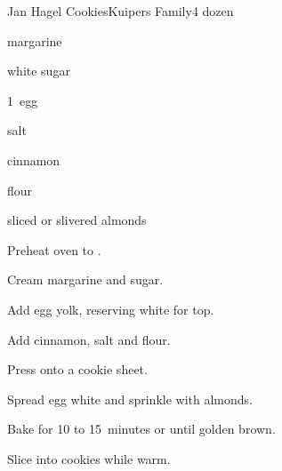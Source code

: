 \begin{recipe}{Jan Hagel Cookies}{Kuipers Family}{4 dozen}

\begin{ingredients}
\item {} margarine
\item {} white sugar
\item 1~egg
\item \tp{\half} salt
\item \tp{\half} cinnamon
\item {} flour
\item sliced or slivered almonds
\end{ingredients}

\begin{directions}
\item Preheat oven to .
\item Cream margarine and sugar.
\item Add egg yolk, reserving white for top.
\item Add cinnamon, salt and flour.
\item Press onto a cookie sheet.
\item Spread egg white and sprinkle with almonds.
\item Bake for 10 to 15~minutes or until golden brown.
\item Slice into cookies while warm.
\end{directions}
\end{recipe}
